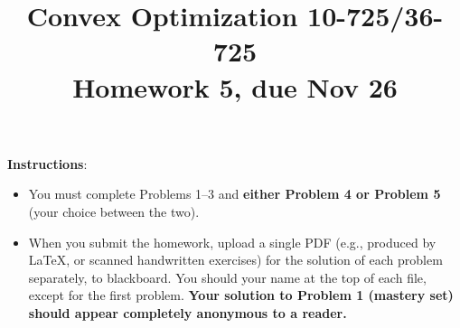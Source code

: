 \documentclass[12pt]{article}
\title{Convex Optimization 10-725/36-725 \\Homework 5, due Nov 26}
\date{}
\begin{document}
\maketitle

{\bf Instructions}: 
\begin{itemize}
\item
You must complete Problems 1--3 and {\bf either
Problem 4 or Problem 5} (your choice between the two). 
\item When you
submit the homework, upload a single PDF (e.g., produced by LaTeX,
or scanned handwritten exercises) for the solution of each problem 
separately, to blackboard. You should your name at the top of each 
file, except for the first problem. {\bf Your solution to Problem 1
(mastery set) should appear completely anonymous to a reader.}
\end{itemize}









\end{document}
